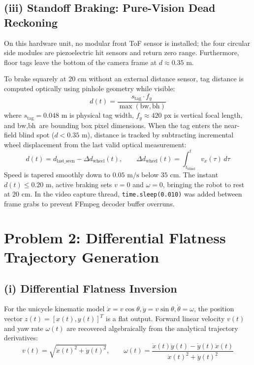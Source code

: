 \documentclass[10pt,a4paper]{article}
\begin{document}
\subsection*{(iii) Standoff Braking: Pure-Vision Dead Reckoning}
On this hardware unit, no modular front ToF sensor is installed; the four circular side modules are piezoelectric hit sensors and return zero range. Furthermore, floor tags leave the bottom of the camera frame at $d \approx 0.35\text{~m}$.

To brake squarely at $20\text{~cm}$ without an external distance sensor, tag distance is computed optically using pinhole geometry while visible:
\begin{equation}
    d(t) = \frac{s_{\text{tag}} \cdot f_y}{\max(\text{bw}, \text{bh})}
\end{equation}
where $s_{\text{tag}} = 0.048\text{~m}$ is physical tag width, $f_y \approx 420\text{~px}$ is vertical focal length, and $\text{bw}, \text{bh}$ are bounding box pixel dimensions. When the tag enters the near-field blind spot ($d < 0.35\text{~m}$), distance is tracked by subtracting incremental wheel displacement from the last valid optical measurement:
\begin{equation}
    d(t) = d_{\text{last\_seen}} - \Delta d_{\text{wheel}}(t), \qquad \Delta d_{\text{wheel}}(t) = \int_{t_{\text{blind}}}^t v_x(\tau)\,d\tau
\end{equation}
Speed is tapered smoothly down to $0.05\text{~m/s}$ below $35\text{~cm}$. The instant $d(t) \le 0.20\text{~m}$, active braking sets $v = 0$ and $\omega = 0$, bringing the robot to rest at $20\text{~cm}$. In the video capture thread, \texttt{time.sleep(0.010)} was added between frame grabs to prevent FFmpeg decoder buffer overruns.

\newpage
\section*{Problem 2: Differential Flatness Trajectory Generation}

\subsection*{(i) Differential Flatness Inversion}
For the unicycle kinematic model $\dot{x} = v\cos\theta, \dot{y} = v\sin\theta, \dot{\theta} = \omega$, the position vector $z(t) = [x(t), y(t)]^T$ is a flat output. Forward linear velocity $v(t)$ and yaw rate $\omega(t)$ are recovered algebraically from the analytical trajectory derivatives:
\begin{equation}
    v(t) = \sqrt{\dot{x}(t)^2 + \dot{y}(t)^2}, \qquad
    \omega(t) = \frac{\dot{x}(t)\ddot{y}(t) - \dot{y}(t)\ddot{x}(t)}{\dot{x}(t)^2 + \dot{y}(t)^2}
    \label{eq:flat_inversion}
\end{equation}
\end{document}
